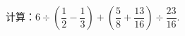 计算：$6\div\left(\dfrac {1}{2}-\dfrac {1}{3}\right)+
\left(\dfrac {5}{8}+\dfrac {13}{16}\right)\div\dfrac {23}{16}$.
